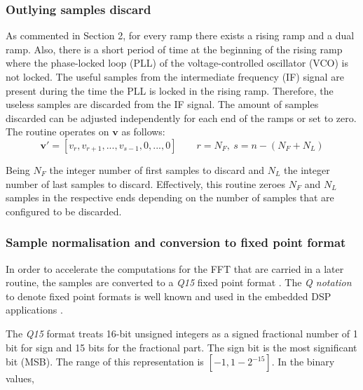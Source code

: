 \subsubsection{Outlying samples discard}

As commented in Section 2, for every ramp there exists a rising ramp and a dual ramp. Also, there is a short period of time at the beginning of the rising ramp where the phase-locked loop (PLL) of the voltage-controlled oscillator (VCO) is not locked. The useful samples from the intermediate frequency (IF) signal are present during the time the PLL is locked in the rising ramp. Therefore, the useless samples are discarded from the IF signal. The amount of samples discarded can be adjusted independently for each end of the ramps or set to zero. The routine operates on $\mathbf{v}$ as follows:
\begin{equation}
	\mathbf{v'} = [v_{r}, v_{r+1}, ..., v_{s-1}, 0, ..., 0] \qquad r = N_F,\ s= n- (N_F+N_L)
\end{equation}

Being $N_F$ the integer number of first samples to discard and $N_L$ the integer number of last samples to discard. Effectively, this routine zeroes $N_F$ and $N_L$ samples in the respective ends depending on the number of samples that are configured to be discarded. %



\subsubsection{Sample normalisation and conversion to fixed point format}

In order to accelerate the computations for the FFT that are carried in a later routine, the samples are converted to a \textit{Q15} fixed point format \cite{ARMQ15}. The \textit{Q notation} to denote fixed point formats is well known and used in the embedded DSP applications \cite{ARMQ15}.

The \textit{Q15} format treats 16-bit unsigned integers as a signed fractional number of 1 bit for sign and 15 bits for the fractional part. The sign bit is the most significant bit (MSB). The range of this representation is $[-1, 1-2^{-15}]$. In the binary values,

